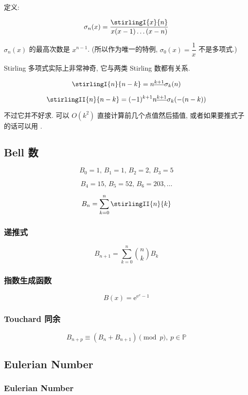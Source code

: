 定义:

\[
    \sigma_n(x) = \frac{\stirlingI{x}{n}}{x(x-1)\dots(x-n)}
\]

\(\sigma_n(x)\) 的最高次数是 \(x^{n - 1}\). (所以作为唯一的特例, \(\sigma_0(x) = \dfrac{1}{x}\) 不是多项式.)

Stirling 多项式实际上非常神奇, 它与两类 Stirling 数都有关系.

\[
    \stirlingI{n}{n-k} = n^{\underline{k+1}} \sigma_k(n)
\]

\[
    \stirlingII{n}{n-k} = (-1)^{k+1} n^{\underline{k+1}} \sigma_k(-(n-k))
\]

不过它并不好求. 可以 \(O(k^2)\) 直接计算前几个点值然后插值, 或者如果要推式子的话可以用 .

\subsection{Bell 数}
\label{sec:bell-数}

\[
    B_0 = 1,\, B_1 = 1,\, B_2 = 2,\, B_3 = 5
\]

\[
    B_4 = 15,\, B_5 = 52,\, B_6 = 203, \dots
\]

\[
    B_n = \sum_{k = 0} ^ n \stirlingII{n}{k}
\]

\subsubsection{递推式}

\[
    B_{n + 1} = \sum_{k = 0} ^n \binom{n}{k} B_k
\]

\subsubsection{指数生成函数}

\[
    B(x) = \mathrm{e}^{\mathrm{e}^x - 1}
\]

\subsubsection{Touchard 同余}

\[
    B_{n + p} \equiv (B_n + B_{n + 1}) \pmod p,~p\in\mathbb{P}
\]

\subsection{Eulerian Number}
\label{sec:eulerian-number}

\subsubsection{Eulerian Number}
\label{ssec:eulerian-number}

